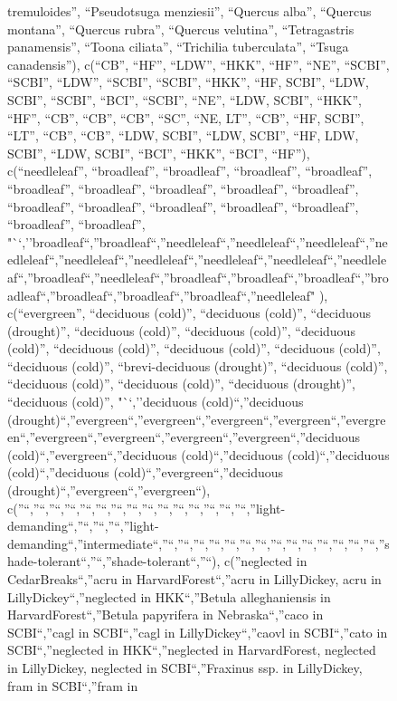 \documentclass[
]{article}
\begin{document}
\begin{figure}
{tremuloides'', ``Pseudotsuga menziesii'', ``Quercus alba'', ``Quercus
montana'', ``Quercus rubra'', ``Quercus velutina'', ``Tetragastris
panamensis'', ``Toona ciliata'', ``Trichilia tuberculata'', ``Tsuga
canadensis''), c(``CB'', ``HF'', ``LDW'', ``HKK'', ``HF'', ``NE'',
``SCBI'', ``SCBI'', ``LDW'', ``SCBI'', ``SCBI'', ``HKK'', ``HF, SCBI'',
``LDW, SCBI'', ``SCBI'', ``BCI'', ``SCBI'', ``NE'', ``LDW, SCBI'',
``HKK'', ``HF'', ``CB'', ``CB'', ``CB'', ``SC'', ``NE, LT'', ``CB'',
``HF, SCBI'', ``LT'', ``CB'', ``CB'', ``LDW, SCBI'', ``LDW, SCBI'',
``HF, LDW, SCBI'', ``LDW, SCBI'', ``BCI'', ``HKK'', ``BCI'', ``HF''),
c(``needleleaf'', ``broadleaf'', ``broadleaf'', ``broadleaf'',
``broadleaf'', ``broadleaf'', ``broadleaf'', ``broadleaf'',
``broadleaf'', ``broadleaf'', ``broadleaf'', ``broadleaf'',
``broadleaf'', ``broadleaf'', ``broadleaf'', ``broadleaf'',
``broadleaf'',
"``,''broadleaf``,''broadleaf``,''needleleaf``,''needleleaf``,''needleleaf``,''needleleaf``,''needleleaf``,''needleleaf``,''needleleaf``,''needleleaf``,''needleleaf``,''broadleaf``,''needleleaf``,''broadleaf``,''broadleaf``,''broadleaf``,''broadleaf``,''broadleaf``,''broadleaf``,''broadleaf``,''needleleaf"
), c(``evergreen'', ``deciduous (cold)'', ``deciduous (cold)'',
``deciduous (drought)'', ``deciduous (cold)'', ``deciduous (cold)'',
``deciduous (cold)'', ``deciduous (cold)'', ``deciduous (cold)'',
``deciduous (cold)'', ``deciduous (cold)'', ``brevi-deciduous
(drought)'', ``deciduous (cold)'', ``deciduous (cold)'', ``deciduous
(cold)'', ``deciduous (drought)'', ``deciduous (cold)'', "``,''deciduous
(cold)``,''deciduous
(drought)``,''evergreen``,''evergreen``,''evergreen``,''evergreen``,''evergreen``,''evergreen``,''evergreen``,''evergreen``,''evergreen``,''deciduous
(cold)``,''evergreen``,''deciduous (cold)``,''deciduous
(cold)``,''deciduous (cold)``,''deciduous
(cold)``,''evergreen``,''deciduous
(drought)``,''evergreen``,''evergreen``),
c(''``,''``,''``,''``,''``,''``,''``,''``,''``,''``,''``,''``,''``,''``,''``,''light-demanding``,''``,''``,''``,''light-demanding``,''intermediate``,''``,''``,''``,''``,''``,''``,''``,''``,''``,''``,''``,''``,''``,''``,''shade-tolerant``,''``,''shade-tolerant``,''``),
c(''neglected in CedarBreaks``,''acru in HarvardForest``,''acru in
LillyDickey, acru in LillyDickey``,''neglected in HKK``,''Betula
alleghaniensis in HarvardForest``,''Betula papyrifera in
Nebraska``,''caco in SCBI``,''cagl in SCBI``,''cagl in
LillyDickey``,''caovl in SCBI``,''cato in SCBI``,''neglected in
HKK``,''neglected in HarvardForest, neglected in LillyDickey, neglected
in SCBI``,''Fraxinus ssp. in LillyDickey, fram in SCBI``,''fram in
}
\end{figure}
\end{document}
